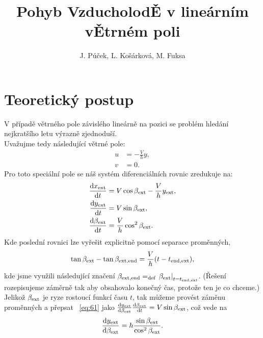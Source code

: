 \documentclass[reqno, a4paper]{amsart}
\author{J. Púček, L. Košárková, M. Fuksa}
\title{Pohyb Vzducholod\v{E} v lineárním v\v{E}trném poli}
\begin{document}
\maketitle
\section{Teoretický postup}
\label{sec:teorie}
V případě větrného pole závislého lineárně na pozici se problém hledání nejkratšího letu výrazně zjednoduší. \\
Uvažujme tedy následující větrné pole:
\begin{subequations}
  \label{eq:56}
  \begin{align}
    \label{eq:57}
    u &= - \frac{V}{h}y, \\
    \label{eq:58}
    v &= 0.
  \end{align}
\end{subequations}
Pro toto speciální pole se náš systém diferenciálních rovnic zredukuje na:
\begin{subequations}
  \label{eq:59}
  \begin{align}
    \label{eq:60}
    \frac{\mathrm{d} {x_{\mathrm{ext}}}}{\mathrm{d} {t}}
    &=
      V \cos \beta_{\mathrm{ext}} - \frac{V}{h}y_{\mathrm{ext}},  \\
    \label{eq:61}
    \frac{\mathrm{d} {y_{\mathrm{ext}}}}{\mathrm{d} {t}}
    &=
      V \sin \beta_{\mathrm{ext}},  \\
    \label{eq:62}
    \frac{\mathrm{d} {\beta_{\mathrm{ext}}}}{\mathrm{d} {t}}
    &=
      \frac{V}{h}
      \cos^2 \beta_{\mathrm{ext}}
      .
  \end{align}
\end{subequations}
Kde poslední rovnici lze vyřešit explicitně pomocí separace proměnných,
\begin{equation}
  \label{eq:63}
  \tan \beta_{\mathrm{ext}} -  \tan \beta_{\mathrm{ext}, \mathrm{end}} = \frac{V}{h} (t - t_{\mathrm{end}, \mathrm{ext}}), 
\end{equation}
kde jsme využili následující značení $\beta_{\mathrm{ext}, \mathrm{end}} = _{\mathrm{def}} \left. \beta_{\mathrm{ext}} \right|_{t = t_{\mathrm{end}, \mathrm{ext}}} $. (Řešení rozepisujeme záměrně tak aby obsahovalo konečný čas, protože ten je co chceme.) Jelikož $\beta_{\mathrm{ext}}$ je ryze rostoucí funkcí času $t$, tak můžeme provést záměnu proměnných a přepsat ~\eqref{eq:61} jako
$
  \frac{\mathrm{d} {y_{\mathrm{ext}}}}{\mathrm{d} {\beta_{\mathrm{ext}}}} \frac{\mathrm{d} {\beta_{\mathrm{ext}}}}{\mathrm{d} {t}}
  =
  V \sin \beta_{\mathrm{ext}}
$,
což vede na
\begin{equation}
  \label{eq:64}
  \frac{\mathrm{d} {y_{\mathrm{ext}}}}{\mathrm{d} {\beta_{\mathrm{ext}}}} = h \frac{\sin \beta_{\mathrm{ext}}}{\cos^2 \beta_{\mathrm{ext}}}.
\end{equation}
\end{document}

